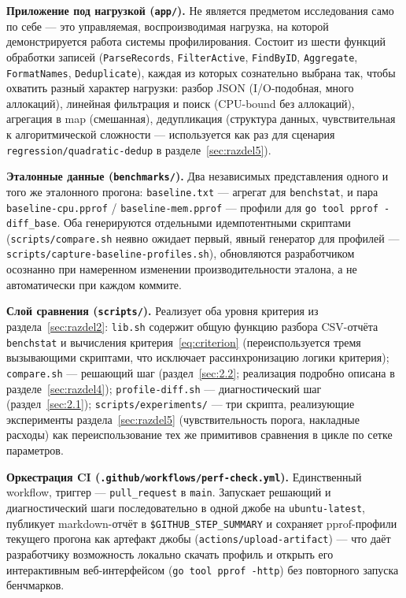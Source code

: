 \documentclass[12pt,a4paper]{article}
\numberwithin{equation}{section}
\begin{document}
\textbf{Приложение под нагрузкой (\texttt{app/\allowbreak }).} Не является предметом
исследования само по себе — это управляемая, воспроизводимая нагрузка,
на которой демонстрируется работа системы профилирования. Состоит из
шести функций обработки записей (\texttt{ParseRecords}, \texttt{FilterActive},
\texttt{FindByID}, \texttt{Aggregate}, \texttt{FormatNames},
\texttt{Deduplicate}), каждая из которых сознательно выбрана так, чтобы
охватить разный характер нагрузки: разбор JSON (I/O-подобная, много
аллокаций), линейная фильтрация и поиск (CPU-bound без аллокаций),
агрегация в map (смешанная), дедупликация (структура данных,
чувствительная к алгоритмической сложности — используется как раз для
сценария \texttt{regression/\allowbreak quadratic-dedup} в разделе~\ref{sec:razdel5}).

\textbf{Эталонные данные (\texttt{benchmarks/\allowbreak }).} Два независимых
представления одного и того же эталонного прогона: \texttt{baseline.txt} —
агрегат для \texttt{benchstat}, и пара \texttt{baseline-cpu.pprof} /
\texttt{baseline-mem.pprof} — профили для \texttt{go tool pprof
-diff\_base}. Оба генерируются отдельными идемпотентными скриптами
(\texttt{scripts/\allowbreak compare.sh} неявно ожидает первый, явный генератор для
профилей — \texttt{scripts/\allowbreak capture-baseline-profiles.sh}), обновляются
разработчиком осознанно при намеренном изменении производительности
эталона, а не автоматически при каждом коммите.

\textbf{Слой сравнения (\texttt{scripts/\allowbreak }).} Реализует оба уровня
критерия из раздела~\ref{sec:razdel2}: \texttt{lib.sh} содержит общую
функцию разбора CSV-отчёта \texttt{benchstat} и вычисления
критерия~\eqref{eq:criterion} (переиспользуется тремя вызывающими
скриптами, что исключает рассинхронизацию логики критерия);
\texttt{compare.sh} — решающий шаг (раздел~\ref{sec:2.2}; реализация
подробно описана в разделе~\ref{sec:razdel4}); \texttt{profile-diff.sh} —
диагностический шаг (раздел~\ref{sec:2.1}); \texttt{scripts/\allowbreak experiments/\allowbreak }
— три скрипта, реализующие эксперименты раздела~\ref{sec:razdel5}
(чувствительность порога, накладные расходы) как переиспользование тех же
примитивов сравнения в цикле по сетке параметров.

\textbf{Оркестрация CI (\texttt{.github/\allowbreak workflows/\allowbreak perf-check.yml}).}
Единственный workflow, триггер — \texttt{pull\_request} в \texttt{main}.
Запускает решающий и диагностический шаги последовательно в одной джобе на
\texttt{ubuntu-latest}, публикует markdown-отчёт в
\texttt{\$GITHUB\_STEP\_SUMMARY} и сохраняет pprof-профили текущего
прогона как артефакт джобы (\texttt{actions/\allowbreak upload-artifact}) — что даёт
разработчику возможность локально скачать профиль и открыть его
интерактивным веб-интерфейсом (\texttt{go tool pprof -http}) без
повторного запуска бенчмарков.
\end{document}
